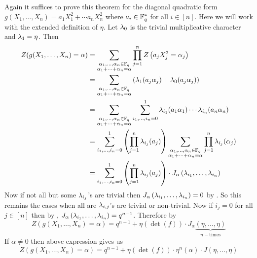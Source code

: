 \begin{alternate-proof}
  Again it suffices to prove this theorem for the diagonal quadratic form $g(X_1,\dots, X_n)=a_1X_1^2+\cdots a_nX_n^2$ where $a_i\in\mathbb{F}_q^*$ for all $i\in[n]$. Here we will work with the extended definition of $\eta$. Let $\lambda_0$ is the trivial multiplicative character and $\lambda_1=\eta$. Then 
    \begin{align*}
      Z(g(X_1,\dots, X_n)=\alpha) & = \sum_{\substack{\alpha_1,\dots,\alpha_n\in\mathbb{F}_q\\ \alpha_1+\cdots+\alpha_n=\alpha}}\prod_{j=1}^nZ\left(a_jX_j^2=\alpha_j\right)\\ 
      & = \sum_{\substack{\alpha_1,\dots,\alpha_n\in\mathbb{F}_q\\ \alpha_1+\cdots+\alpha_n=\alpha}}\left(\lambda_1(a_j\alpha_j)+\lambda_0(a_j\alpha_j)\right)\\ 
      & = \sum_{\substack{\alpha_1,\dots,\alpha_n\in\mathbb{F}_q\\ \alpha_1+\cdots+\alpha_n=\alpha}}\sum_{i_1,\dots,i_n=0}^1\lambda_{i_1}(a_1\alpha_1)\cdots \lambda_{i_n}(a_n\alpha_n)\\ 
      & = \sum_{i_1,\dots,i_n=0}^1 \left(\prod_{j=1}^n\lambda_{i_j}(a_j)\right) \sum_{\substack{\alpha_1,\dots,\alpha_n\in\mathbb{F}_q\\ \alpha_1+\cdots+\alpha_n=\alpha}}\prod_{j=1}^n\lambda_{i_j}(\alpha_j)\\ 
      & = \sum_{i_1,\dots,i_n=0}^1 \left(\prod_{j=1}^n\lambda_{i_j}(a_j)\right) \cdot J_{\alpha}\left(\lambda_{i_1},\dots, \lambda_{i_n}\right)
    \end{align*}
    Now if not all but some $\lambda_{i_j}$'s are trivial then $J_{\alpha}\left(\lambda_{i_1},\dots, \lambda_{i_n}\right)=0$ by \JacobiCompletethm[(ii)]. So this remains the cases when all are $\lambda_{i,j}$'s are trivial or non-trivial. Now if $i_j=0$ for all $j\in[n]$ then by \JacobiCompletethm[(i)], $J_{\alpha}\left(\lambda_{i_1},\dots, \lambda_{i_n}\right)=q^{n-1}$. Therefore by \begin{equation}\label{eq:quad-jacobi-etas}
      Z(g(X_1,\dots, X_n)=\alpha) =q^{n-1}+\eta(\det(f))\cdot J_{\alpha}\underbrace{(\eta,\dots, \eta)}_{n-\text{times}}
    \end{equation}If $\alpha\neq 0$ then above expression gives us \begin{equation}\label{eq:quad-jacobi-nonzero}
      Z(g(X_1,\dots, X_n)=\alpha) =q^{n-1}+\eta(\det(f))\cdot \eta^n(\alpha)\cdot J(\eta,\dots, \eta)
    \end{equation}
    \begin{enumerate}[label=(\roman*)]

\end{enumerate}
\end{alternate-proof}
